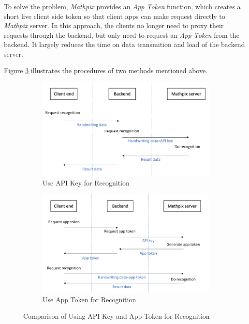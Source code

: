 \documentclass[12pt,twoside]{report}
\begin{document}
To solve the problem, \textit{Mathpix} provides an \textit{App Token} function, which creates a short live client side token so that client apps can make request directly to \textit{Mathpix} server. In this approach, the clients no longer need to proxy their requests through the backend, but only need to request an \textit{App Token} from the backend. It largely reduces the time on data transmition and load of the backend server. 

Figure \ref{fig:comparison-key-token} illustrates the procedures of two methods mentioned above.
\begin{figure}[h]
    \centering
    \begin{subfigure}[c]{\hsize}
        \centering
        \includegraphics[width=\linewidth, frame]{figures/use-apikey.png}
        \caption{Use API Key for Recognition}
        \label{fig:use-apikey}
    \end{subfigure}
    \begin{subfigure}[c]{\hsize}
        \centering
        \includegraphics[width=\linewidth, frame]{figures/use-apptoken.png}
        \caption{Use App Token for Recognition}
        \label{fig:use-apptoken}
    \end{subfigure}
    \caption{Comparison of Using API Key and App Token for Recognition}
    \label{fig:comparison-key-token}
\end{figure}
\end{document}
